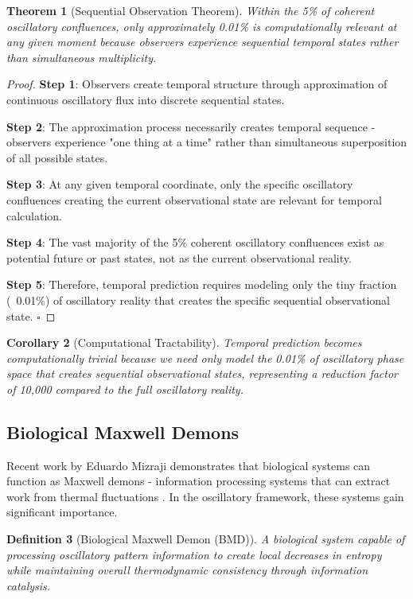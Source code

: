 \documentclass[11pt,a4paper]{article}
\newtheorem{theorem}{Theorem}[section]
\newtheorem{corollary}[theorem]{Corollary}
\newtheorem{definition}[theorem]{Definition}
\theoremstyle{remark}
\begin{document}
\begin{theorem}[Sequential Observation Theorem]
Within the 5\% of coherent oscillatory confluences, only approximately 0.01\% is computationally relevant at any given moment because observers experience sequential temporal states rather than simultaneous multiplicity.
\end{theorem}

\begin{proof}
\textbf{Step 1}: Observers create temporal structure through approximation of continuous oscillatory flux into discrete sequential states.

\textbf{Step 2}: The approximation process necessarily creates temporal sequence - observers experience "one thing at a time" rather than simultaneous superposition of all possible states.

\textbf{Step 3}: At any given temporal coordinate, only the specific oscillatory confluences creating the current observational state are relevant for temporal calculation.

\textbf{Step 4}: The vast majority of the 5\% coherent oscillatory confluences exist as potential future or past states, not as the current observational reality.

\textbf{Step 5}: Therefore, temporal prediction requires modeling only the tiny fraction (~0.01\%) of oscillatory reality that creates the specific sequential observational state. $\square$
\end{proof}

\begin{corollary}[Computational Tractability]
Temporal prediction becomes computationally trivial because we need only model the 0.01\% of oscillatory phase space that creates sequential observational states, representing a reduction factor of 10,000 compared to the full oscillatory reality.
\end{corollary}

\subsection{Biological Maxwell Demons}

Recent work by Eduardo Mizraji demonstrates that biological systems can function as Maxwell demons - information processing systems that can extract work from thermal fluctuations \cite{mizraji2007biological}. In the oscillatory framework, these systems gain significant importance.

\begin{definition}[Biological Maxwell Demon (BMD)]
A biological system capable of processing oscillatory pattern information to create local decreases in entropy while maintaining overall thermodynamic consistency through information catalysis.
\end{definition}
\end{document}
